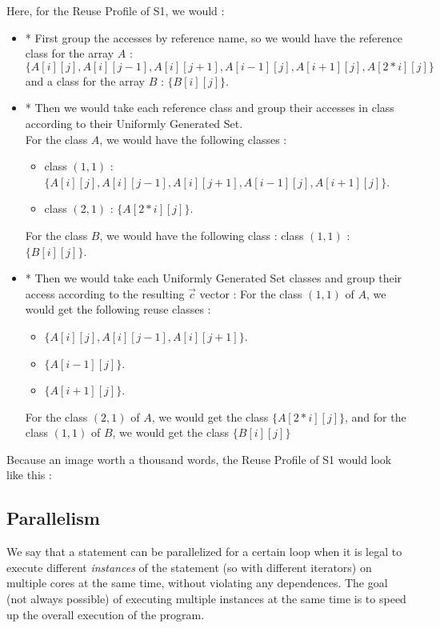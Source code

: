 \documentclass[paper=a4, fontsize=11pt]{scrartcl}
\numberwithin{equation}{section}        %
\numberwithin{figure}{section}          %
\numberwithin{table}{section}               %
\begin{document}
        Here, for the Reuse Profile of S1, we would :
        \begin{itemize}
            \item* First group the accesses by reference name, so we would have the reference
                class for the array $A$ : $\{A[i][j],A[i][j-1],A[i][j+1],A[i-1][j],A[i+1][j],A[2*i][j]\}$
                and a class for the array $B$ : $\{B[i][j]\}$.
            \item* Then we would take each reference class and group their accesses in class
                according to their Uniformly Generated Set.\\
                For the class $A$, we would have the following classes :
                    \begin{itemize}
                        \item class $(1,1)$ : $\{A[i][j],A[i][j-1],A[i][j+1],A[i-1][j],A[i+1][j]\}$.
                        \item class $(2,1)$ : $\{A[2*i][j]\}$.
                    \end{itemize}
                For the class $B$, we would have the following class : class $(1,1)$ : $\{B[i][j]\}$.
            \item* Then we would take each Uniformly Generated Set classes and group their
                access according to the resulting $\vec{c}$ vector :
                For the class $(1,1)$ of $A$, we would get the following reuse classes :
                \begin{itemize}
                    \item $\{A[i][j],A[i][j-1],A[i][j+1]\}$.
                    \item $\{A[i-1][j]\}$.
                    \item $\{A[i+1][j]\}$.
                \end{itemize}
                For the class $(2,1)$ of $A$, we would get the class $\{A[2*i][j]\}$, and
                for the class $(1,1)$ of $B$, we would get the class $\{B[i][j]\}$
        \end{itemize}
        
        Because an image worth a thousand words, the Reuse Profile of S1 would look like this :


    \subsection{Parallelism}
        We say that a statement can be parallelized for a certain loop when it is legal to
        execute different \textit{instances} of the statement (so with different iterators)
        on multiple cores at the same time, without violating any dependences. The
        goal (not always possible) of executing multiple instances at the same time is to
        speed up the overall execution of the program.
\end{document}
